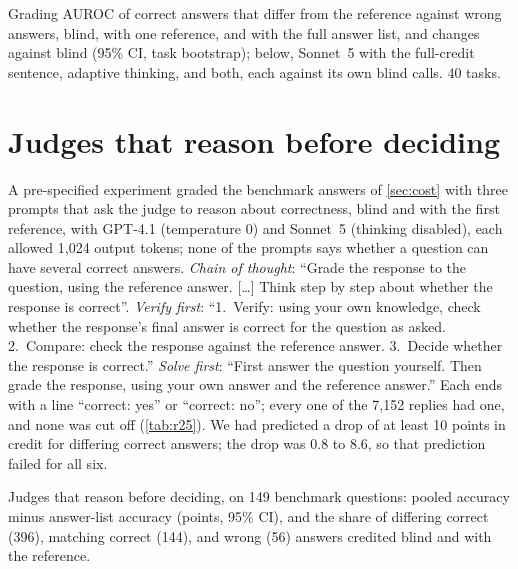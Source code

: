 \begin{table}[htbp]
\centering
\caption{Grading AUROC of correct answers that differ from the reference against wrong answers, blind, with one reference, and with the full answer list, and changes against blind (95\% CI, task bootstrap); below, Sonnet~5 with the full-credit sentence, adaptive thinking, and both, each against its own blind calls. 40 tasks.\pre}
\label{tab:r24-fix}
\footnotesize
\setlength{\tabcolsep}{3pt}
\begin{adjustbox}{max width=\linewidth}\end{adjustbox}
\end{table}

\FloatBarrier
\section{Judges that reason before deciding}
\label{app:r25}

A pre-specified experiment graded the benchmark answers of \cref{sec:cost} with three prompts that ask the judge to reason about correctness, blind and with the first reference, with GPT-4.1 (temperature 0) and Sonnet~5 (thinking disabled), each allowed 1,024 output tokens; none of the prompts says whether a question can have several correct answers. \emph{Chain of thought}: ``Grade the response to the question, using the reference answer. [\ldots] Think step by step about whether the response is correct''. \emph{Verify first}: ``1.~Verify: using your own knowledge, check whether the response's final answer is correct for the question as asked. 2.~Compare: check the response against the reference answer. 3.~Decide whether the response is correct.'' \emph{Solve first}: ``First answer the question yourself. Then grade the response, using your own answer and the reference answer.'' Each ends with a line ``correct: yes'' or ``correct: no''; every one of the 7,152 replies had one, and none was cut off (\cref{tab:r25}). We had predicted a drop of at least 10 points in credit for differing correct answers; the drop was 0.8 to 8.6, so that prediction failed for all six.

\begin{table}[htbp]
\centering
\caption{Judges that reason before deciding, on 149 benchmark questions: pooled accuracy minus answer-list accuracy (points, 95\% CI), and the share of differing correct (396), matching correct (144), and wrong (56) answers credited blind and with the reference.\pre}
\label{tab:r25}
\footnotesize
\setlength{\tabcolsep}{3pt}
\begin{adjustbox}{max width=\linewidth}\end{adjustbox}
\end{table}

